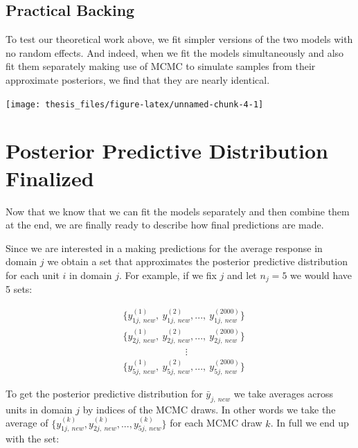 \documentclass[12pt,twoside]{reedthesis}
\begin{document}
\hypertarget{practical-backing}{%
\subsection{Practical Backing}\label{practical-backing}}

To test our theoretical work above, we fit simpler versions of the two models with no random effects. And indeed, when we fit the models simultaneously and also fit them separately making use of MCMC to simulate samples from their approximate posteriors, we find that they are nearly identical.
\begin{center}\texttt{[image: thesis\_files/figure-latex/unnamed-chunk-4-1]} \end{center}

\hypertarget{posterior-predictive-distribution-finalized}{%
\section{Posterior Predictive Distribution Finalized}\label{posterior-predictive-distribution-finalized}}

Now that we know that we can fit the models separately and then combine them at the end, we are finally ready to describe how final predictions are made.

Since we are interested in a making predictions for the average response in domain \(j\) we obtain a set that approximates the posterior predictive distribution for each unit \(i\) in domain \(j\). For example, if we fix \(j\) and let \(n_j = 5\) we would have 5 sets:

\[
\begin{aligned}
&\Big\{y_{1j , \ new}^{(1)}, \ y_{1j, \ new}^{(2)}, ..., \ y_{1j, \ new}^{(2000)}\Big\} \\
&\Big\{y_{2j , \ new}^{(1)}, \ y_{2j, \ new}^{(2)}, ...,  \ y_{2j, \ new}^{(2000)}\Big\} \\
& \qquad \qquad \qquad \ \   \vdots \\
&\Big\{y_{5j , \ new}^{(1)}, \ y_{5j, \ new}^{(2)}, ..., \ y_{5j, \ new}^{(2000)}\Big\}
\end{aligned}
\]

To get the posterior predictive distribution for \(\bar{y}_{j, \ new}\) we take averages across units in domain \(j\) by indices of the MCMC draws. In other words we take the average of \(\Big\{y_{1j, \ new}^{(k)}, y_{2j, \ new}^{(k)}, ... , y_{5j, \ new}^{(k)}\Big\}\) for each MCMC draw \(k\). In full we end up with the set:
\end{document}
